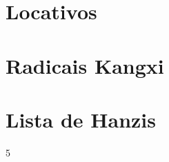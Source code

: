 \documentclass[a4paper,9pt,twoside,openright]{memoir}
\begin{document}
\clearpage
\chapter{Locativos}


\clearpage
\chapter{Radicais Kangxi}


\fi

\clearpage
\chapter{Lista de Hanzis}
\begin{multicols}{5}
 \begin{KeepFromToc}
  \listoffirsthanzis
 \end{KeepFromToc}
\end{multicols}
\end{document}

